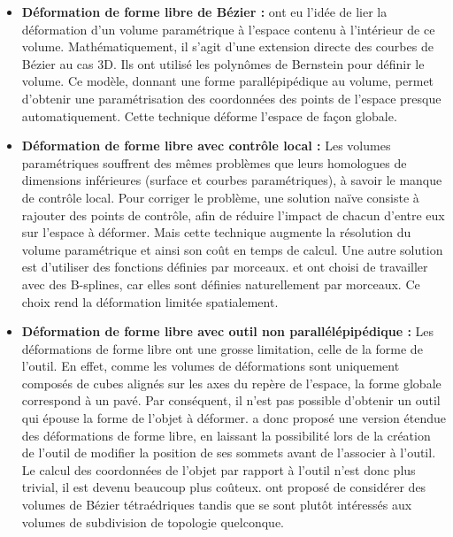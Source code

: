 \begin{itemize}

\item{\textbf{Déformation de forme libre de Bézier :}} \cite{SP86} ont eu
l'idée de lier la déformation d'un volume paramétrique à l'espace contenu à
l'intérieur de ce volume. Mathématiquement, il s'agit d'une extension directe
des courbes de Bézier au cas 3D. Ils ont utilisé les polynômes de Bernstein
pour définir le volume. Ce modèle, donnant une forme parallépipédique au
volume, permet d'obtenir une paramétrisation des coordonnées des points de
l'espace presque automatiquement. Cette technique déforme l'espace de façon
globale.

\item{\textbf{Déformation de forme libre avec contrôle local :}} Les volumes
paramétriques souffrent des mêmes problèmes que leurs homologues de dimensions
inférieures (surface et courbes paramétriques), à savoir le manque de contrôle
local. Pour corriger le problème, une solution naïve consiste à rajouter des
points de contrôle, afin de réduire l'impact de chacun d'entre eux sur
l'espace à déformer. Mais cette technique augmente la résolution du volume
paramétrique et ainsi son coût en temps de calcul. Une autre solution est
d'utiliser des fonctions définies par morceaux. \cite{GP89} et \cite{Com89}
ont choisi de travailler avec des B-splines, car elles sont définies
naturellement par morceaux. Ce choix rend la déformation limitée spatialement.

\item{\textbf{Déformation de forme libre avec outil non  parallélépipédique
:}} Les déformations de forme libre ont une grosse limitation, celle de la
forme de l'outil. En effet, comme les volumes de déformations sont uniquement
composés de cubes alignés sur les axes du repère de l'espace, la forme globale
correspond à un pavé. Par conséquent, il n'est pas possible d'obtenir un outil
qui épouse la forme de l'objet à déformer. \cite{Coq90} a donc proposé une
version étendue des déformations de forme libre, en laissant la possibilité
lors de la création de l'outil de modifier la position de ses sommets avant de
l'associer à l'outil. Le calcul des coordonnées de l'objet par rapport à
l'outil n'est donc plus trivial, il est devenu beaucoup plus coûteux.
\cite{BBT97} ont proposé de considérer des volumes de Bézier tétraédriques
tandis que \cite{MJ96} se sont plutôt intéressés aux volumes de subdivision de
topologie quelconque.

\end{itemize}

